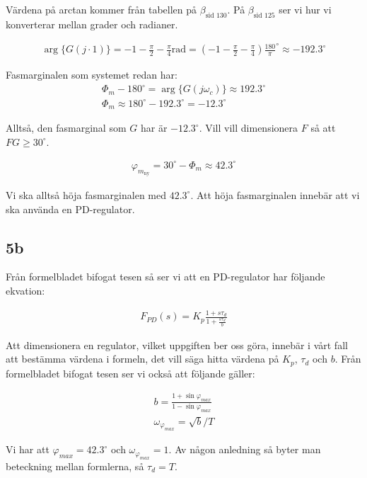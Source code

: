 \documentclass[a4paper]{article}
\newcommand{\mhb}[1]{$\beta_{\text{#1}}$}     %
\newcommand{\oklarhet}[1]{%
  \noindent\fbox{\parbox[b][4em][t]{\textwidth}{\color{red}#1} }%
}
\begin{document}
Värdena på arctan kommer från tabellen på \mhb{sid 130}. På \mhb{sid 125} ser vi hur vi konverterar mellan grader och radianer.

\begin{align*}
  \arg\{G(j\cdot 1)\} = -1 -\frac{\pi}{2} -\frac{\pi}{4} \text{rad} = (-1 -\frac{\pi}{2} -\frac{\pi}{4})\frac{180}{\pi}^\circ \approx -192.3^\circ
\end{align*}

Fasmarginalen som systemet redan har:
\begin{align*}
  \Phi_m - 180^\circ = \arg\{G(j\omega_c)\} \approx 192.3^\circ\\
  \Phi_m \approx 180^\circ - 192.3^\circ = -12.3^\circ
\end{align*}

Alltså, den fasmarginal som $G$ har är $-12.3^\circ$. Vill vill dimensionera $F$ så att $FG \geq 30^\circ$.

\begin{align*}
  \varphi_{m_{\text{ny}}} = 30^\circ - \Phi_m \approx 42.3^\circ
\end{align*}

Vi ska alltså höja fasmarginalen med $42.3^\circ$. Att höja fasmarginalen innebär att vi ska använda en PD-regulator.


\subsection{5b}
Från formelbladet bifogat tesen så ser vi att en PD-regulator har följande ekvation:

\begin{align*}
  F_{PD}(s) = K_p \frac{1+s\tau_d}{1+\frac{s\tau_d}{b}}
\end{align*}

Att dimensionera en regulator, vilket uppgiften ber oss göra, innebär i vårt fall att bestämma värdena i formeln, det vill säga hitta värdena på $K_p$, $\tau_d$ och $b$. Från formelbladet bifogat tesen ser vi också att följande gäller:

\begin{align*}
  b = \frac{1 + \sin \varphi_{max}}{1 - \sin \varphi_{max}}\\
  \omega_{\varphi_{max}} = \sqrt{b}/T
\end{align*}

Vi har att $\varphi_{max} = 42.3^\circ$ och $\omega_{\varphi_{max}} = 1$. Av någon anledning så byter man beteckning mellan formlerna, så $\tau_d = T$.\\
\oklarhet{Varför är $T = \tau_d$?}
\end{document}
